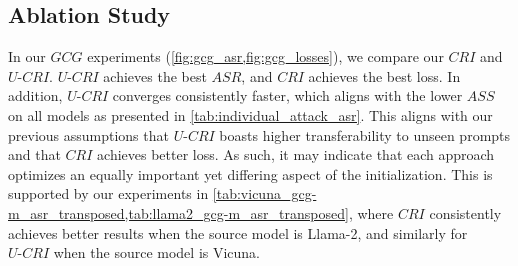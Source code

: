 
 


\subsection{Ablation Study}
\label{subsec:ablation}

In our $GCG$ experiments (\cref{fig:gcg_asr,fig:gcg_losses}), we compare our $CRI$ and $U\text{-}CRI$. $U\text{-}CRI$ achieves the best $ASR$, and $CRI$ achieves the best loss. In addition, $U\text{-}CRI$ converges consistently faster, which aligns with the lower $ASS$ on all models as presented in \cref{tab:individual_attack_asr}. This aligns with our previous assumptions that $U\text{-}CRI$ boasts higher transferability to unseen prompts and that $CRI$ achieves better loss. As such, it may indicate that each approach optimizes an equally important yet differing aspect of the initialization. This is supported by our experiments in \cref{tab:vicuna_gcg-m_asr_transposed,tab:llama2_gcg-m_asr_transposed}, where $CRI$ consistently achieves better results when the source model is Llama-2, and similarly for $U\text{-}CRI$ when the source model is Vicuna.

